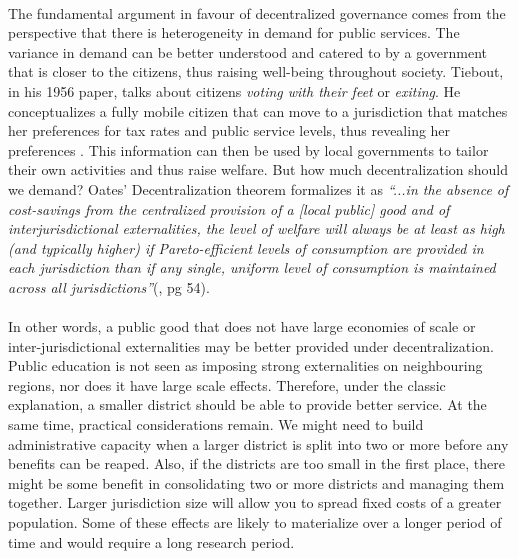 \documentclass[12pt, a4paper]{article}
\begin{document}
\paragraph{} The fundamental argument in favour of decentralized governance comes from the perspective that there is heterogeneity in demand for public services. The variance in demand can be better understood and catered to by a government that is closer to the citizens, thus raising well-being throughout society. Tiebout, in his 1956 paper, talks about citizens \textit{voting with their feet} or \textit{exiting}. He conceptualizes a fully mobile citizen that can move to a jurisdiction that matches her preferences for tax rates and public service levels, thus revealing her preferences \parencite{tiebout_economies_1960}. This information can then be used by local governments to tailor their own activities and thus raise welfare. But how much decentralization should we demand? Oates' Decentralization theorem formalizes it as \textit{``...in the absence of cost-savings from the centralized provision of a [local public] good and of interjurisdictional externalities, the level of welfare will always be at least as high (and typically higher) if Pareto-efficient levels of consumption are provided in each jurisdiction than if any single, uniform level of consumption is maintained across all jurisdictions''}(\cite{oates_fiscal_1972}, pg 54). \nocite{oates1999essay}

\paragraph{} In other words, a public good that does not have large economies of scale or inter-jurisdictional externalities may be better provided under decentralization. Public education is not seen as imposing strong externalities on neighbouring regions, nor does it have large scale effects. Therefore, under the classic explanation, a smaller district should be able to provide better service. At the same time, practical considerations remain. We might need to build administrative capacity when a larger district is split into two or more before any benefits can be reaped. Also, if the districts are too small in the first place, there might be some benefit in consolidating two or more districts and managing them together. Larger jurisdiction size will allow you to spread fixed costs of a greater population. Some of these effects are likely to materialize over a longer period of time and would require a long research period. \nocite{allers2016effects}
\end{document}
